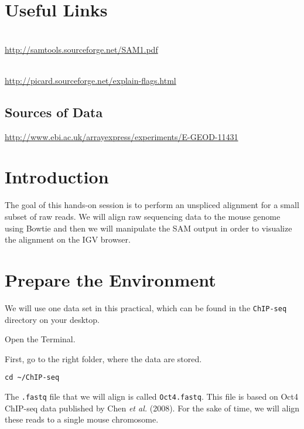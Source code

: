 \section{Useful Links}
 
\begin{description}[style=multiline,labelindent=0cm,align=left,leftmargin=0.5cm]
  \item[SAM Specification]\hfill\\
    \url{http://samtools.sourceforge.net/SAM1.pdf}
  \item[Explain SAM Flags]\hfill\\
    \url{http://picard.sourceforge.net/explain-flags.html}
\end{description}

\subsection{Sources of Data}
  \url{http://www.ebi.ac.uk/arrayexpress/experiments/E-GEOD-11431}

\clearpage

\section{Introduction}

\begin{information}
The goal of this hands-on session is to perform an unspliced alignment for a
small subset of raw reads. We will align raw sequencing data to the mouse genome
using Bowtie and then we will manipulate the SAM output in order to
visualize the alignment on the IGV browser.
\end{information}

\section{Prepare the Environment}

\begin{information}
We will use one data set in this practical, which can be found in the \texttt{ChIP-seq}
directory on your desktop.
\end{information}

\begin{steps}
Open the Terminal.

First, go to the right folder, where the data are stored.
\begin{lstlisting}
cd ~/ChIP-seq
\end{lstlisting}

\begin{information}
The \texttt{.fastq} file that we will align is called \texttt{Oct4.fastq}. This
file is based on Oct4 ChIP-seq data published by Chen \textit{et al.} (2008). For the
sake of time, we will align these reads to a single mouse chromosome.
\end{information}
\end{steps}

